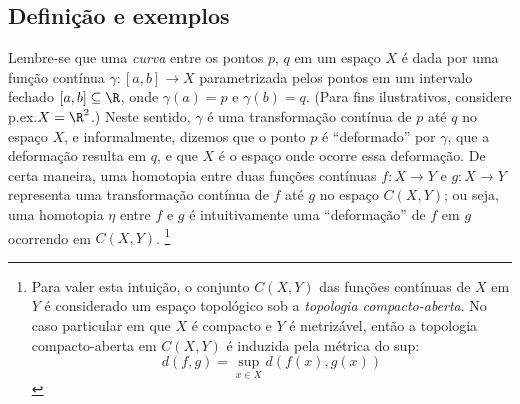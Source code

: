 \subsection{Definição e exemplos}


Lembre-se que uma \emph{curva} entre os pontos $p$, $q$ em um espaço $X$ é dada por uma função contínua $\gamma : [a, b] \to X$ parametrizada pelos pontos em um intervalo fechado $[a, b] \subseteq \R$, onde $\gamma(a) = p$ e $\gamma(b) = q$. (Para fins ilustrativos, considere p.\@ ex.\@ $X = \R^2$.) Neste sentido, $\gamma$ é uma transformação contínua de $p$ até $q$ no espaço $X$, e informalmente, dizemos que o ponto $p$ é ``deformado'' por $\gamma$, que a deformação resulta em $q$, e que $X$ é o espaço onde ocorre essa deformação. De certa maneira, uma homotopia entre duas funções contínuas $f : X \to Y$ e $g : X \to Y$ representa uma transformação contínua de $f$ até $g$ no espaço $C(X, Y)$; ou seja, uma homotopia $\eta$ entre $f$ e $g$ é intuitivamente uma ``deformação'' de $f$ em $g$ ocorrendo em $C(X, Y)$.%
\footnote
{
    Para valer esta intuição, o conjunto $C(X, Y)$ das funções contínuas de $X$ em $Y$ é considerado um espaço topológico sob a \emph{topologia compacto-aberta}. No caso particular em que $X$ é compacto e $Y$ é metrizável, então a topologia compacto-aberta em $C(X, Y)$ é induzida pela métrica do sup:
    \[
    d(f, g) = \sup_{x \in X} d(f(x), g(x))
    \]
}

